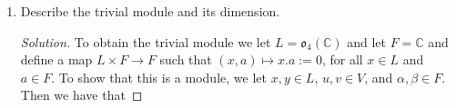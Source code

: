 \documentclass[12pt]{article}
\theoremstyle{definition}
\newenvironment{solution}
{\renewcommand\qedsymbol{$\blacksquare$}\begin{proof}[Solution]}
{\end{proof}}
\begin{document}
\begin{enumerate}
\begin{enumerate}
\begin{solution}
\begin{equation*}
\begin{split}
\begin{pmatrix}
                                    \end{pmatrix}+b\begin{pmatrix}0&0&1&0\\0&0&0&0\\-1&0&0&0\\0&0&0&0
                                    \end{pmatrix}+c\begin{pmatrix}0&0&0&1\\0&0&0&0\\0&0&0&0\\-1&0&0&0
                                    \end{pmatrix}\\&+d\begin{pmatrix}0&0&0&0\\0&0&1&0\\0&-1&0&0\\0&0&0&0
                                    \end{pmatrix}+e\begin{pmatrix}0&0&0&0\\0&0&0&1\\0&0&0&0\\0&-1&0&0
                                    \end{pmatrix}+f\begin{pmatrix}0&0&0&0\\0&0&0&0\\0&0&0&1\\0&0&-1&0
                                    \end{pmatrix}
                                \end{split}
                            \end{equation*}
                        With this it follows that $\text{dim}(\mathfrak{o}_4(\mathbb{C}))=6$.
                    \end{solution}
                \item Describe the trivial module and its dimension.
                    \begin{solution}
                        To obtain the trivial module we let
                        $L=\mathfrak{o}_4(\mathbb{C})$ and let $F=\mathbb{C}$
                        and define a map $L\times F\to F$ such that
                        $(x, a)\mapsto x.a:=0$, for all $x\in L$ and $a\in F$.
                        To show that this is a module, we let $x, y\in L$, $u,
                        v\in V$, and $\alpha, \beta\in F$. Then we have that 

\end{solution}
\end{enumerate}
\end{enumerate}
\end{document}
